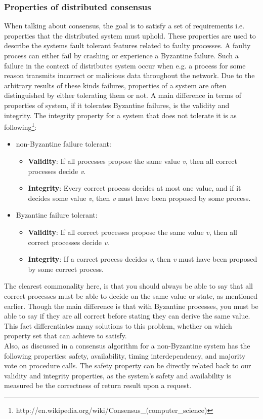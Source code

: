 \subsubsection{Properties of distributed consensus}
When talking about consensus, the goal is to satisfy a set of requirements i.e. properties that the distributed system must uphold. These properties are used to describe the systems fault tolerant features related to faulty processes. A faulty process can either fail by crashing or experience a Byzantine failure. Such a failure in the context of distributes system occur when e.g. a process for some reason transmits incorrect or malicious data throughout the network. Due to the arbitrary results of these kinds failures, properties of a system are often distinguished by either tolerating them or not. A main difference in terms of properties of system, if it tolerates Byzantine failures, is the validity and integrity. The integrity property for a system that does not tolerate it is as following\footnote{http://en.wikipedia.org/wiki/Consensus\_(computer\_science)}:
\begin{itemize}
\item non-Byzantine failure tolerant:
	\begin{itemize}
	\item \textbf{Validity}: If all processes propose the same value \textit{v}, then all correct processes decide \textit{v}.
	\item \textbf{Integrity}: Every correct process decides at most one value, and if it decides some value \textit{v}, then \textit{v} must have been proposed by some process.
	\end{itemize}
\item Byzantine failure tolerant:
	\begin{itemize}
	\item \textbf{Validity}: If all correct processes propose the same value \textit{v}, then all correct processes decide \textit{v}.
	\item \textbf{Integrity}: If a correct process decides \textit{v}, then \textit{v} must have been proposed by some correct process.
	\end{itemize}
\end{itemize}
The clearest commonality here, is that you should always be able to say that all correct processes must be able to decide on the same value or state, as mentioned earlier. Though the main difference is that with Byzantine processes, you must be able to say if they are all correct before stating they can derive the same value. This fact differentiates many solutions to this problem, whether on which property set that can achieve to satisfy. \\
Also, as discussed in \cite{Raft} a consensus algorithm for a non-Byzantine system has the following properties: safety, availability, timing interdependency, and majority vote on procedure calls. The safety property can be directly related back to our validity and integrity properties, as the system's safety and availability is measured be the correctness of return result upon a request.

